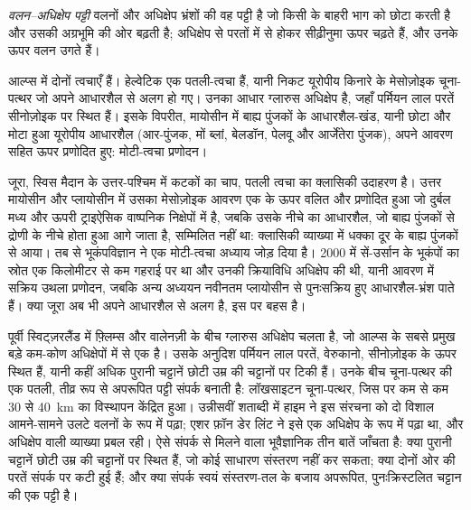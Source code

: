 \begin{definition}[वलन--अधिक्षेप पट्टी]\label{def:b2:alpine-orogen:ftb}
\emph{वलन--अधिक्षेप पट्टी} वलनों और अधिक्षेप भ्रंशों की वह पट्टी है
जो किसी  के बाहरी भाग को छोटा करती है और उसकी अग्रभूमि की ओर बढ़ती है; अधिक्षेप
 से परतों में से होकर सीढ़ीनुमा ऊपर चढ़ते हैं, और उनके ऊपर वलन उगते हैं।
\end{definition}

आल्प्स में दोनों त्वचाएँ हैं। हेल्वेटिक  एक पतली-त्वचा  हैं, यानी
निकट यूरोपीय किनारे के मेसोज़ोइक चूना-पत्थर जो अपने आधारशैल से अलग हो गए। उनका आधार
ग्लारुस अधिक्षेप है, जहाँ पर्मियन लाल परतें सीनोज़ोइक  पर स्थित हैं। इसके विपरीत, मायोसीन में
बाह्य पुंजकों के आधारशैल-खंड, यानी छोटा और मोटा हुआ यूरोपीय आधारशैल (आर-पुंजक,
मों ब्लां, बेलडॉन, पेलवू और आर्जेंतेरा पुंजक), अपने आवरण सहित ऊपर
प्रणोदित हुए: मोटी-त्वचा प्रणोदन।

जूरा, स्विस मैदान के उत्तर-पश्चिम में कटकों का चाप, पतली त्वचा का क्लासिकी
उदाहरण है। उत्तर मायोसीन और प्लायोसीन में उसका मेसोज़ोइक आवरण एक  के ऊपर
वलित और प्रणोदित हुआ जो दुर्बल मध्य और ऊपरी ट्राइऐसिक वाष्पनिक निक्षेपों में है, जबकि उसके नीचे का आधारशैल,
जो बाह्य पुंजकों से  द्रोणी के नीचे होता हुआ आगे जाता है, सम्मिलित नहीं था: 
क्लासिकी व्याख्या में धक्का दूर के बाह्य पुंजकों से आया। तब से भूकंपविज्ञान ने
एक मोटी-त्वचा अध्याय जोड़ दिया है। 2000 में सें-उर्सान के भूकंपों का स्रोत
एक किलोमीटर से कम गहराई पर था और उनकी क्रियाविधि अधिक्षेप की थी, यानी आवरण में सक्रिय उथला प्रणोदन,
जबकि अन्य अध्ययन नवीनतम प्लायोसीन से पुनःसक्रिय हुए आधारशैल-भ्रंश पाते हैं। क्या
जूरा अब भी अपने आधारशैल से अलग है, इस पर बहस है।

\begin{inthefield}[एक अधिक्षेप-संपर्क को पढ़ना]
पूर्वी स्विट्ज़रलैंड में फ़्लिम्स और वालेनज़ी के बीच ग्लारुस अधिक्षेप चलता है, जो आल्प्स के
सबसे प्रमुख बड़े कम-कोण अधिक्षेपों में से एक है। उसके अनुदिश पर्मियन लाल परतें,
वेरुकानो, सीनोज़ोइक  के ऊपर स्थित हैं, यानी कहीं अधिक पुरानी चट्टानें छोटी उम्र की चट्टानों पर टिकी हैं। उनके बीच
चूना-पत्थर की एक पतली, तीव्र रूप से अपरूपित पट्टी संपर्क बनाती है: लॉखसाइटन चूना-पत्थर, जिस पर कम से कम 30 से
\qty{40}{km} का विस्थापन केंद्रित हुआ। उन्नीसवीं शताब्दी में हाइम ने इस संरचना को दो विशाल
आमने-सामने उलटे वलनों के रूप में पढ़ा; एशर फ़ॉन डेर लिंट ने इसे एक अधिक्षेप के रूप में पढ़ा था, और अधिक्षेप वाली व्याख्या प्रबल रही। ऐसे संपर्क से मिलने वाला भूवैज्ञानिक
तीन बातें जाँचता है: क्या पुरानी चट्टानें छोटी उम्र की चट्टानों पर स्थित हैं, जो कोई साधारण संस्तरण नहीं कर सकता;
क्या दोनों ओर की परतें संपर्क पर कटी हुई हैं; और क्या संपर्क
स्वयं संस्तरण-तल के बजाय अपरूपित, पुनःक्रिस्टलित चट्टान की एक पट्टी है।
\end{inthefield}

